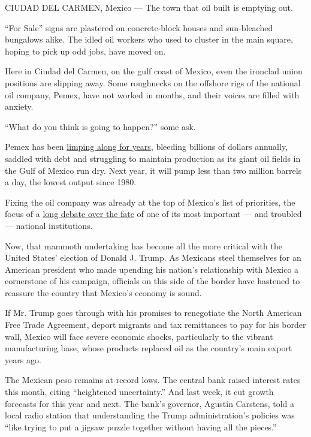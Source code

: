 CIUDAD DEL CARMEN, Mexico --- The town that oil built is emptying out.

``For Sale'' signs are plastered on concrete-block houses and
sun-bleached bungalows alike. The idled oil workers who used to cluster
in the main square, hoping to pick up odd jobs, have moved on.

Here in Ciudad del Carmen, on the gulf coast of Mexico, even the
ironclad union positions are slipping away. Some roughnecks on the
offshore rigs of the national oil company, Pemex, have not worked in
months, and their voices are filled with anxiety.

``What do you think is going to happen?'' some ask.

Pemex has been
\href{http://www.nytimes3xbfgragh.onion/2013/12/13/world/americas/mexico-oil.html}{limping
along for years}, bleeding billions of dollars annually, saddled with
debt and struggling to maintain production as its giant oil fields in
the Gulf of Mexico run dry. Next year, it will pump less than two
million barrels a day, the lowest output since 1980.

Fixing the oil company was already at the top of Mexico's list of
priorities, the focus of a
\href{http://www.nytimes3xbfgragh.onion/2013/12/13/world/americas/mexico-oil.html}{long
debate over the fate} of one of its most important --- and troubled ---
national institutions.

Now, that mammoth undertaking has become all the more critical with the
United States' election of Donald J. Trump. As Mexicans steel themselves
for an American president who made upending his nation's relationship
with Mexico a cornerstone of his campaign, officials on this side of the
border have hastened to reassure the country that Mexico's economy is
sound.

If Mr. Trump goes through with his promises to renegotiate the North
American Free Trade Agreement, deport migrants and tax remittances to
pay for his border wall, Mexico will face severe economic shocks,
particularly to the vibrant manufacturing base, whose products replaced
oil as the country's main export years ago.

The Mexican peso remains at record lows. The central bank raised
interest rates this month, citing ``heightened uncertainty.'' And last
week, it cut growth forecasts for this year and next. The bank's
governor, Agustín Carstens, told a local radio station that
understanding the Trump administration's policies was ``like trying to
put a jigsaw puzzle together without having all the pieces.''

